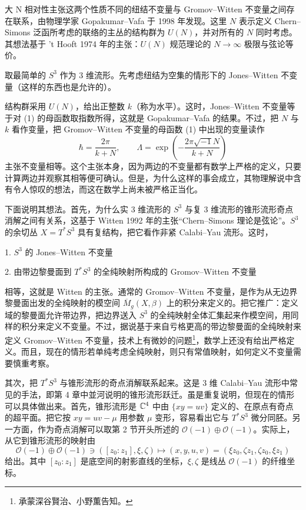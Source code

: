 大 N 相对性主张这两个性质不同的纽结不变量与 Gromov--Witten 不变量之间存在联系，由物理学家 Gopakumar--Vafa 于 1998 年发现。这里 $N$ 表示定义 Chern--Simons 泛函所考虑的联络的主丛的结构群为 $U(N)$，并对所有的 $N$ 同时考虑。其想法基于 't Hooft 1974 年的主张：$U(N)$ 规范理论的 $N\to\infty$ 极限与弦论等价。

取最简单的 $S^{3}$ 作为 3 维流形。先考虑纽结为空集的情形下的 Jones--Witten 不变量（这样的东西也是允许的）。

结构群采用 $U(N)$，给出正整数 $k$（称为水平）。这时，Jones--Witten 不变量等于对 (1) 的母函数取指数所得，这就是 Gopakumar--Vafa 的结果。不过，把 $N$ 与 $k$ 看作变量，把 Gromov--Witten 不变量的母函数 (1) 中出现的变量读作
\[ \hbar=\frac{2\pi}{k+N},\qquad \Lambda=\exp\left(-\frac{2\pi\sqrt{-1}N}{k+N}\right) \]
主张不变量相等。这个主张本身，因为两边的不变量都有数学上严格的定义，只要计算两边并观察其相等便可确认。但是，为什么这样的事会成立，其物理解说中含有令人惊叹的想法，而这在数学上尚未被严格正当化。

下面说明其想法。首先，为什么实 3 维流形的 $S^{3}$ 与复 3 维流形的锥形流形奇点消解之间有关系，这基于 Witten 1992 年的主张“Chern--Simons 理论是弦论”。$S^{3}$ 的余切丛 $X=T^{*}S^{3}$ 具有复结构，把它看作非紧 Calabi--Yau 流形。这时，

1. $S^{3}$ 的 Jones--Witten 不变量

2. 由带边黎曼面到 $T^{*}S^{3}$ 的全纯映射所构成的 Gromov--Witten 不变量

相等，这就是 Witten 的主张。通常的 Gromov--Witten 不变量，是作为从无边界黎曼面出发的全纯映射的模空间 $\overline{M}_{g}(X,\beta)$ 上的积分来定义的。把它推广：定义域的黎曼面允许带边界，把边界送入 $S^{3}$ 的全纯映射全体汇集起来作模空间，用同样的积分来定义不变量。不过，据说基于来自亏格更高的带边黎曼面的全纯映射来定义 Gromov--Witten 不变量，技术上有微妙的问题\footnote{承蒙深谷賢治、小野薫告知。}，数学上还没有给出严格定义。而且，现在的情形若单纯考虑全纯映射，则只有常值映射，如何定义不变量需要慎重考察。

其次，把 $T^{*}S^{3}$ 与锥形流形的奇点消解联系起来。这是 3 维 Calabi--Yau 流形中常见的手法，即第 4 章中並河说明的锥形流形跃迁。虽是重复说明，但现在的情形可以具体做出来。首先，锥形流形是 $\mathbb{C}^{4}$ 中由 $\{xy=uv\}$ 定义的、在原点有奇点的超平面。把它按 $xy=uv-\mu$ 用参数 $\mu$ 变形，容易看出它与 $T^{*}S^{3}$ 微分同胚。另一方面，作为奇点消解可以取第 2 节开头所述的 $\mathcal{O}(-1)\oplus\mathcal{O}(-1)$。实际上，从它到锥形流形的映射由
\[ \mathcal{O}(-1)\oplus\mathcal{O}(-1)\ni([z_{0}:z_{1}],\xi,\zeta)\mapsto(x,y,u,v)=(\xi z_{0},\zeta z_{1},\zeta z_{0},\xi z_{1}) \]
给出。其中 $[z_{0}:z_{1}]$ 是底空间的射影直线的坐标，$\xi,\zeta$ 是线丛 $\mathcal{O}(-1)$ 的纤维坐标。

